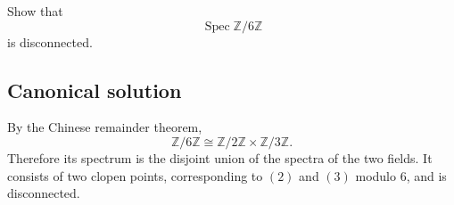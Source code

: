 
\begin{exercise}
	Show that
	\[
	\operatorname{Spec} \mathbb{Z}/6\mathbb{Z}
	\]
	is disconnected.
\end{exercise}

\subsection*{Canonical solution}
By the Chinese remainder theorem,
\[
\mathbb Z/6\mathbb Z\cong \mathbb Z/2\mathbb Z\times\mathbb Z/3\mathbb Z.
\]
Therefore its spectrum is the disjoint union of the spectra of the two fields. It consists of two clopen points, corresponding to $(2)$ and $(3)$ modulo $6$, and is disconnected.
